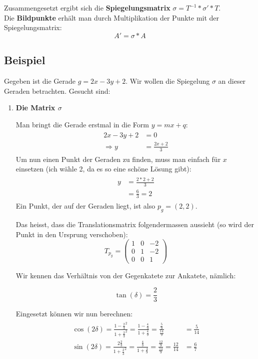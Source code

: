 Zusammengesetzt ergibt sich die \textbf{Spiegelungsmatrix} $\sigma = T^{-1}*\sigma'*T$.\\

Die \textbf{Bildpunkte} erhält man durch Multiplikation der Punkte mit der Spiegelungsmatrix:
\[
A' = \sigma * A
\]

\subsection{Beispiel}
Gegeben ist die Gerade $g = 2x - 3y + 2$. Wir wollen die Spiegelung $\sigma$ an dieser Geraden betrachten. Gesucht sind:

\begin{enumerate}
\item \textbf{Die Matrix $\sigma$}

Man bringt die Gerade erstmal in die Form $y = mx + q$:
\begin{align}
\begin{split}
2x - 3y + 2 &= 0\\
\Rightarrow y &= \frac{2x + 2}{3}
\end{split}
\end{align}
Um nun einen Punkt der Geraden zu finden, muss man einfach für $x$ einsetzen (ich wähle 2, da es so eine schöne Lösung gibt):
\begin{align}
\begin{split}
y &= \frac{2*2 + 2}{3}\\
&=  \frac{6}{3} = 2
\end{split}
\end{align}
Ein Punkt, der auf der Geraden liegt, ist also $p_g = (2,2)$.

Das heisst, dass die Translationsmatrix folgendermassen aussieht (so wird der Punkt in den Ursprung verschoben):
\[
T_{p_g} = \begin{pmatrix}
1 & 0 & -2\\
0 & 1 & -2\\
0 & 0 & 1
\end{pmatrix}
\]

Wir kennen das Verhältnis von der Gegenkatete zur Ankatete, nämlich: 

\[
\tan (\delta) = \frac{2}{3}
\]

Eingesetzt können wir nun berechnen:
\begin{align}
\begin{split}
\cos (2\delta) = \frac{1-\frac{2}{3}^2}{1+\frac{2}{3}^2} = \frac{1-\frac{4}{9}}{1+\frac{4}{9}} = \frac{\frac{5}{9}}{\frac{14}{9}} &= \frac{5}{14}\\
\sin (2\delta) = \frac{2\frac{2}{3}}{1+\frac{2}{3}^2} = \frac{\frac{4}{3}}{1+\frac{4}{9}} = \frac{\frac{12}{9}}{\frac{14}{9}} = \frac{12}{14} &= \frac{6}{7}\\
\end{split}
\end{align}


\end{enumerate}

